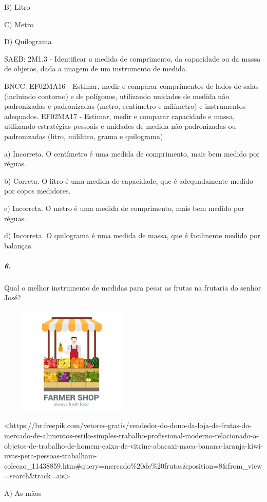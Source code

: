 B) Litro

C) Metro

D) Quilograma

SAEB: 2M1.3 - Identificar a medida de comprimento, da capacidade ou da
massa de objetos, dada a imagem de um instrumento de medida.

BNCC: EF02MA16 - Estimar, medir e comparar comprimentos de lados de
salas (incluindo contorno) e de polígonos, utilizando unidades de medida
não padronizadas e padronizadas (metro, centímetro e milímetro) e
instrumentos adequados. EF02MA17 - Estimar, medir e comparar capacidade
e massa, utilizando estratégias pessoais e unidades de medida não
padronizadas ou padronizadas (litro, mililitro, grama e quilograma).

a) Incorreta. O centímetro é uma medida de comprimento, mais bem medido
por réguas.

b) Correta. O litro é uma medida de capacidade, que é adequadamente
medido por copos medidores.

c) Incorreta. O metro é uma medida de comprimento, mais bem medido por
réguas.

d) Incorreta. O quilograma é uma medida de massa, que é facilmente
medido por balanças.

\subparagraph{6. }\label{section-150}

Qual o melhor instrumento de medidas para pesar as frutas na frutaria do
senhor José?

\includegraphics[width=2.72569in,height=2.04904in]{media/image166.png}

\textless{}https://br.freepik.com/vetores-gratis/vendedor-do-dono-da-loja-de-frutas-do-mercado-de-alimentos-estilo-simples-trabalho-profissional-moderno-relacionado-a-objetos-de-trabalho-de-homem-caixa-de-vitrine-abacaxi-maca-banana-laranja-kiwi-uvas-pera-pessoas-trabalham-colecao\_11438859.htm\#query=mercado\%20de\%20frutas\&position=8\&from\_view=search\&track=ais\textgreater{}

A) As mãos

